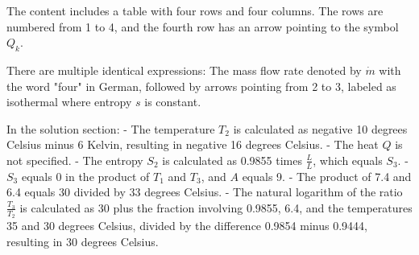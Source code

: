 The content includes a table with four rows and four columns. The rows are numbered from 1 to 4, and the fourth row has an arrow pointing to the symbol \( Q_k \).

There are multiple identical expressions:
The mass flow rate denoted by \( \dot{m} \) with the word "four" in German, followed by arrows pointing from 2 to 3, labeled as isothermal where entropy \( s \) is constant.

In the solution section:
- The temperature \( T_2 \) is calculated as negative 10 degrees Celsius minus 6 Kelvin, resulting in negative 16 degrees Celsius.
- The heat \( Q \) is not specified.
- The entropy \( S_2 \) is calculated as 0.9855 times \( \frac{L}{L} \), which equals \( S_3 \).
- \( S_3 \) equals 0 in the product of \( T_1 \) and \( T_3 \), and \( A \) equals 9.
- The product of 7.4 and 6.4 equals 30 divided by 33 degrees Celsius.
- The natural logarithm of the ratio \( \frac{T_3}{T_2} \) is calculated as 30 plus the fraction involving 0.9855, 6.4, and the temperatures 35 and 30 degrees Celsius, divided by the difference 0.9854 minus 0.9444, resulting in 30 degrees Celsius.